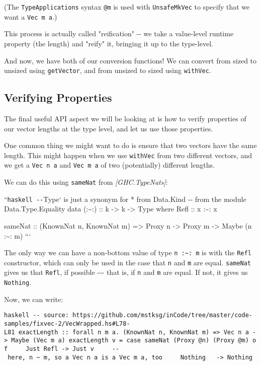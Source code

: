 \documentclass[]{article}
\begin{document}
(The \texttt{TypeApplications} syntax \texttt{@m} is used with
\texttt{UnsafeMkVec} to specify that we want a \texttt{Vec\ m\ a}.)

This process is actually called "reification" -\/- we take a value-level runtime
property (the length) and "reify" it, bringing it up to the type-level.

And now, we have both of our conversion functions! We can convert from sized to
unsized using \texttt{getVector}, and from unsized to sized using
\texttt{withVec}.

\subsection{Verifying Properties}

The final useful API aspect we will be looking at is how to verify properties of
our vector lengths at the type level, and let us use those properties.

One common thing we might want to do is ensure that two vectors have the same
length. This might happen when we use \texttt{withVec} from two different
vectors, and we get a \texttt{Vec\ n\ a} and \texttt{Vec\ m\ a} of two
(potentially) different lengths.

We can do this using \texttt{sameNat} from \emph{{[}GHC.TypeNats{]}}:

``\texttt{haskell\ -\/-}Type` is just a synonym for * from Data.Kind -\/- from
the module Data.Type.Equality data (:\textasciitilde{}:) :: k -\textgreater{} k
-\textgreater{} Type where Refl :: x :\textasciitilde{}: x

sameNat :: (KnownNat n, KnownNat m) =\textgreater{} Proxy n -\textgreater{}
Proxy m -\textgreater{} Maybe (n :\textasciitilde{}: m) ```

The only way we can have a non-bottom value of type
\texttt{n\ :\textasciitilde{}:\ m} is with the \texttt{Refl} constructor, which
can only be used in the case that \texttt{n} and \texttt{m} are equal.
\texttt{sameNat} gives us that \texttt{Refl}, if possible -\/-\/- that is, if
\texttt{n} and \texttt{m} are equal. If not, it gives us \texttt{Nothing}.

Now, we can write:

\texttt{haskell\ -\/-\ source:\ https://github.com/mstksg/inCode/tree/master/code-samples/fixvec-2/VecWrapped.hs\#L78-L81\ exactLength\ ::\ forall\ n\ m\ a.\ (KnownNat\ n,\ KnownNat\ m)\ =\textgreater{}\ Vec\ n\ a\ -\textgreater{}\ Maybe\ (Vec\ m\ a)\ exactLength\ v\ =\ case\ sameNat\ (Proxy\ @n)\ (Proxy\ @m)\ of\ \ \ \ \ Just\ Refl\ -\textgreater{}\ Just\ v\ \ \ \ \ -\/-\ here,\ n\ \textasciitilde{}\ m,\ so\ a\ \textasciigrave{}Vec\ n\ a\textasciigrave{}\ is\ a\ \textasciigrave{}Vec\ m\ a\textasciigrave{},\ too\ \ \ \ \ Nothing\ \ \ -\textgreater{}\ Nothing}
\end{document}
